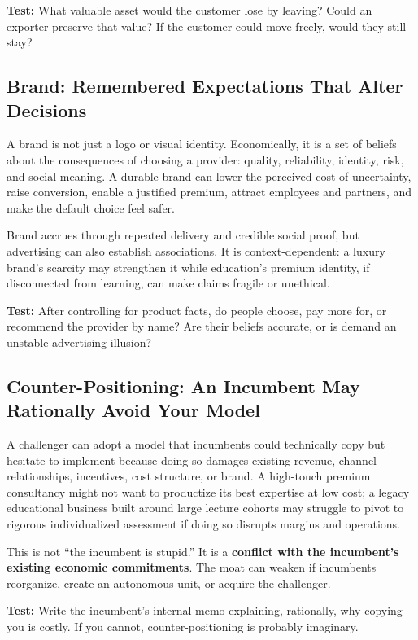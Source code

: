 \textbf{Test:} What valuable asset would the customer lose by leaving? Could an exporter preserve that value? If the customer could move freely, would they still stay?

\subsection{Brand: Remembered Expectations That Alter Decisions}
\label{sec:brand_expectations}

A brand is not just a logo or visual identity. Economically, it is a set of beliefs about the consequences of choosing a provider: quality, reliability, identity, risk, and social meaning. A durable brand can lower the perceived cost of uncertainty, raise conversion, enable a justified premium, attract employees and partners, and make the default choice feel safer.

Brand accrues through repeated delivery and credible social proof, but advertising can also establish associations. It is context-dependent: a luxury brand's scarcity may strengthen it while education's premium identity, if disconnected from learning, can make claims fragile or unethical.

\textbf{Test:} After controlling for product facts, do people choose, pay more for, or recommend the provider by name? Are their beliefs accurate, or is demand an unstable advertising illusion?

\subsection{Counter-Positioning: An Incumbent May Rationally Avoid Your Model}
\label{sec:counter_positioning}

A challenger can adopt a model that incumbents could technically copy but hesitate to implement because doing so damages existing revenue, channel relationships, incentives, cost structure, or brand. A high-touch premium consultancy might not want to productize its best expertise at low cost; a legacy educational business built around large lecture cohorts may struggle to pivot to rigorous individualized assessment if doing so disrupts margins and operations.

This is not ``the incumbent is stupid.'' It is a \textbf{conflict with the incumbent's existing economic commitments}. The moat can weaken if incumbents reorganize, create an autonomous unit, or acquire the challenger.

\textbf{Test:} Write the incumbent's internal memo explaining, rationally, why copying you is costly. If you cannot, counter-positioning is probably imaginary.


